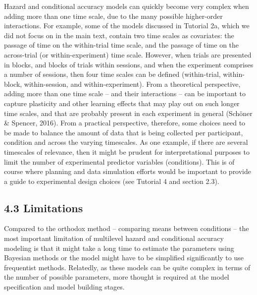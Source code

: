 \documentclass[
  man, donotrepeattitle,floatsintext]{apa6}
\begin{document}
Hazard and conditional accuracy models can quickly become very complex when adding more than one time scale, due to the many possible higher-order interactions.
For example, some of the models discussed in Tutorial 2a, which we did not focus on in the main text, contain two time scales as covariates: the passage of time on the within-trial time scale, and the passage of time on the across-trial (or within-experiment) time scale. However, when trials are presented in blocks, and blocks of trials within sessions, and when the experiment comprises a number of sessions, then four time scales can be defined (within-trial, within-block, within-session, and within-experiment).
From a theoretical perspective, adding more than one time scale -- and their interactions -- can be important to capture plasticity and other learning effects that may play out on such longer time scales, and that are probably present in each experiment in general (Schöner \& Spencer, 2016).
From a practical perspective, therefore, some choices need to be made to balance the amount of data that is being collected per participant, condition and across the varying timescales. As one example, if there are several timescales of relevance, then it might be prudent for interpretational purposes to limit the number of experimental predictor variables (conditions).
This is of course where planning and data simulation efforts would be important to provide a guide to experimental design choices (see Tutorial 4 and section 2.3).

\subsection{4.3 Limitations}\label{limitations}

Compared to the orthodox method -- comparing means between conditions -- the most important limitation of multilevel hazard and conditional accuracy modeling is that it might take a long time to estimate the parameters using Bayesian methods or the model might have to be simplified significantly to use frequentist methods. Relatedly, as these models can be quite complex in terms of the number of possible parameters, more thought is required at the model specification and model building stages.
\end{document}
